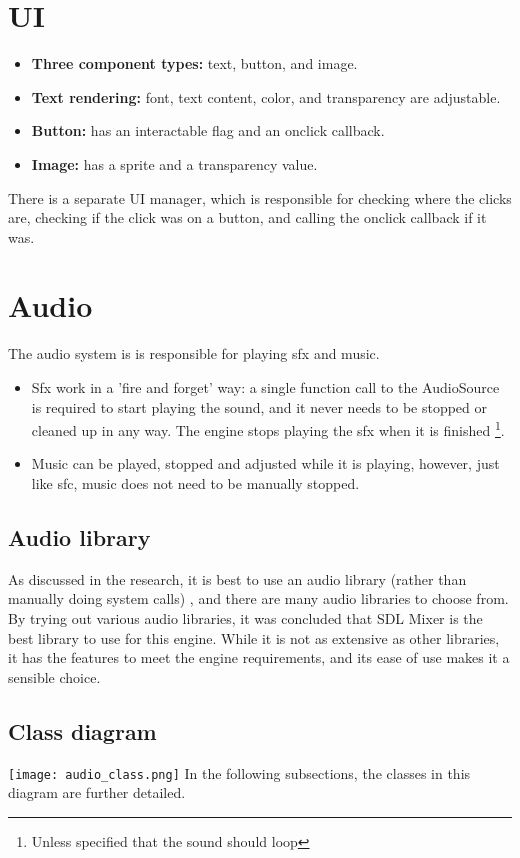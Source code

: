 \documentclass[draft]{article}
\begin{document}
\section{UI}
\begin{itemize}
  \item \textbf{Three component types:} text, button, and image.
  \item \textbf{Text rendering:} font, text content, color, and transparency are adjustable.
  \item \textbf{Button:} has an interactable flag and an onclick callback.
  \item \textbf{Image:} has a sprite and a transparency value.
\end{itemize}

\noindent
There is a separate UI manager, which is responsible for checking where the clicks are, checking if the click was on a button, and calling the onclick callback if it was.

\section{Audio}
The audio system is is responsible for playing sfx and music.
\begin{itemize}
  \item Sfx work in a 'fire and forget' way: a single function call to the AudioSource is required to start playing the sound, and it never needs to be stopped or cleaned up in any way. The engine stops playing the sfx when it is finished \footnote{Unless specified that the sound should loop}.
  \item Music can be played, stopped and adjusted while it is playing, however, just like sfc, music does not need to be manually stopped.
\end{itemize}

\subsection{Audio library}
As discussed in the research, it is best to use an audio library (rather than manually doing system calls)
, and there are many audio libraries to choose from. By trying out various audio libraries, it was concluded that
SDL Mixer is the best library to use for this engine. While it is not as extensive as other libraries,
it has the features to meet the engine requirements, and its ease of use makes it a sensible choice.

\subsection{Class diagram}
\texttt{[image: audio\_class.png]}
In the following subsections, the classes in this diagram are further detailed.
\end{document}
